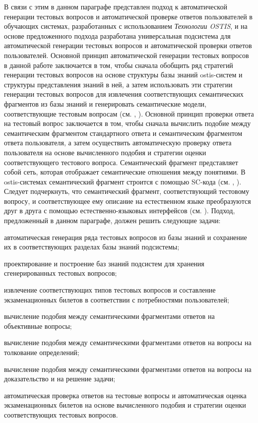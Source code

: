 В связи с этим в данном параграфе представлен подход к автоматической генерации тестовых вопросов и автоматической проверке ответов пользователей в обучающих системах, разработанных с использованием \textit{Технологии OSTIS}, и на основе предложенного подхода разработана универсальная подсистема для автоматической генерации тестовых вопросов и автоматической проверки ответов пользователей. Основной принцип автоматической генерации тестовых вопросов в данной работе заключается в том, чтобы сначала обобщить ряд стратегий генерации тестовых вопросов на основе структуры базы знаний ostis-систем и структуры представления знаний в ней, а затем использовать эти стратегии генерации тестовых вопросов для извлечения соответствующих семантических фрагментов из базы знаний и генерировать семантические модели, соответствующие тестовым вопросам (см. , ). Основной принцип проверки ответа на тестовый вопрос заключается в том, чтобы сначала вычислить подобие между семантическим фрагментом стандартного ответа и семантическим фрагментом ответа пользователя, а затем осуществить автоматическую проверку ответа пользователя на основе вычисленного подобия и стратегии оценки соответствующего тестового вопроса. Семантический фрагмент представляет собой сеть, которая отображает семантические отношения между понятиями. В ostis-системах семантический фрагмент строится с помощью SC-кода (см. , ). Следует подчеркнуть, что семантический фрагмент, соответствующий тестовому вопросу, и соответствующее ему описание на естественном языке преобразуются друг в друга с помощью естественно-языковых интерфейсов (см. ). Подход, предложенный в данном параграфе, должен решить следующие задачи:

\begin{textitemize}
	\item автоматическая генерация ряда тестовых вопросов из базы знаний и сохранение их в соответствующих разделах базы знаний подсистемы;
	\item проектирование и построение баз знаний подсистем для хранения сгенерированных тестовых вопросов;
	\item извлечение соответствующих типов тестовых вопросов и составление экзаменационных билетов в соответствии с потребностями пользователей;
	\item вычисление подобия между семантическими фрагментами ответов на объективные вопросы;
	\item вычисление подобия между семантическими фрагментами ответов на вопросы на толкование определений;
	\item вычисление подобия между семантическими фрагментами ответов на вопросы на доказательство и на решение задачи;
	\item автоматическая проверка ответов на тестовые вопросы и автоматическая оценка экзаменационных билетов на основе вычисленного подобия и стратегии оценки соответствующих тестовых вопросов.
\end{textitemize}


